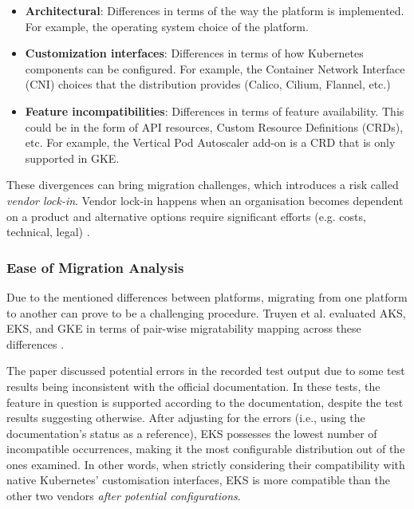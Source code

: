 \begin{itemize}

\item \textbf{Architectural}: Differences in terms of the way the platform is implemented. For example, the operating system choice of the platform.
\item \textbf{Customization interfaces}: Differences in terms of how Kubernetes components can be configured. For example, the Container Network Interface (CNI) choices that the distribution provides (Calico, Cilium, Flannel, etc.)
\item \textbf{Feature incompatibilities}: Differences in terms of feature availability. This could be in the form of API resources, Custom Resource Definitions (CRDs), etc. For example, the Vertical Pod Autoscaler add-on is a CRD that is only supported in GKE.

\end{itemize}

These divergences can bring migration challenges, which introduces a risk called \textit{vendor lock-in}. Vendor lock-in happens when an organisation becomes dependent on a product and alternative options require significant efforts (e.g. costs, technical, legal) \cite{opara2016critical}.



\subsubsection{Ease of Migration Analysis}

Due to the mentioned differences between platforms, migrating from one platform to another can prove to be a challenging procedure. Truyen et al. \cite{truyenManagingFeatureCompatibility2020} evaluated AKS, EKS, and GKE in terms of pair-wise migratability mapping across these differences \cite{truyenManagingFeatureCompatibility2020}. 

The paper discussed potential errors in the recorded test output due to some test results being inconsistent with the official documentation. In these tests, the feature in question is supported according to the documentation, despite the test results suggesting otherwise. After adjusting for the errors (i.e., using the documentation's status as a reference), EKS possesses the lowest number of incompatible occurrences, making it the most configurable distribution out of the ones examined. In other words, when strictly considering their compatibility with native Kubernetes' customisation interfaces, EKS is more compatible than the other two vendors \textit{after potential configurations}.

